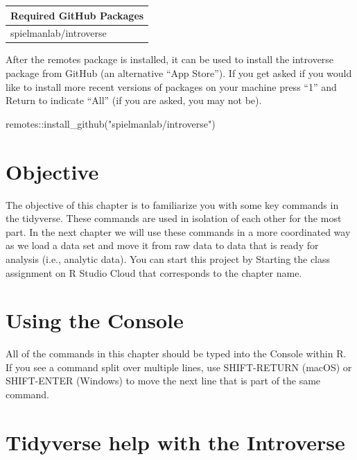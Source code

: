 \documentclass[
]{krantz}
\makeatletter
\newenvironment{Shaded}{\begin{snugshade}}{\end{snugshade}}
\newcommand{\FunctionTok}[1]{\textcolor[rgb]{0,0,0}{#1}}
\newcommand{\NormalTok}[1]{#1}
\newcommand{\SpecialCharTok}[1]{\textcolor[rgb]{0,0,0}{#1}}
\newcommand{\StringTok}[1]{\textcolor[rgb]{0.5,0.5,0.5}{#1}}
\newenvironment{kframe}{%
\medskip{}
\setlength{\fboxsep}{.8em}
 \def\at@end@of@kframe{}%
 \ifinner\ifhmode%
  \def\at@end@of@kframe{\end{minipage}}%
  \begin{minipage}{\columnwidth}%
 \fi\fi%
 \def\FrameCommand##1{\hskip\@totalleftmargin \hskip-\fboxsep
 \colorbox{shadecolor}{##1}\hskip-\fboxsep
     \hskip-\linewidth \hskip-\@totalleftmargin \hskip\columnwidth}%
 \MakeFramed {\advance\hsize-\width
   \@totalleftmargin\z@ \linewidth\hsize
   \@setminipage}}%
 {\par\unskip\endMakeFramed%
 \at@end@of@kframe}
\renewenvironment{Shaded}{\begin{kframe}}{\end{kframe}}
\makeatother
\begin{document}
\begin{longtable}[]{@{}l@{}}
\toprule
Required GitHub Packages \\
\midrule
\endhead
spielmanlab/introverse \\
\bottomrule
\end{longtable}

After the remotes package is installed, it can be used to install the introverse package from GitHub (an alternative ``App Store''). If you get asked if you would like to install more recent versions of packages on your machine press ``1'' and Return to indicate ``All'' (if you are asked, you may not be).

\begin{Shaded}
\begin{Highlighting}[]
\NormalTok{remotes}\SpecialCharTok{::}\FunctionTok{install\_github}\NormalTok{(}\StringTok{"spielmanlab/introverse"}\NormalTok{)}
\end{Highlighting}
\end{Shaded}

\hypertarget{objective}{%
\section{Objective}\label{objective}}

The objective of this chapter is to familiarize you with some key commands in the tidyverse. These commands are used in isolation of each other for the most part. In the next chapter we will use these commands in a more coordinated way as we load a data set and move it from raw data to data that is ready for analysis (i.e., analytic data). You can start this project by Starting the class assignment on R Studio Cloud that corresponds to the chapter name.

\hypertarget{using-the-console}{%
\section{Using the Console}\label{using-the-console}}

All of the commands in this chapter should be typed into the Console within R. If you see a command split over multiple lines, use SHIFT-RETURN (macOS) or SHIFT-ENTER (Windows) to move the next line that is part of the same command.

\hypertarget{tidyverse-help-with-the-introverse}{%
\section{Tidyverse help with the Introverse}\label{tidyverse-help-with-the-introverse}}
\end{document}
